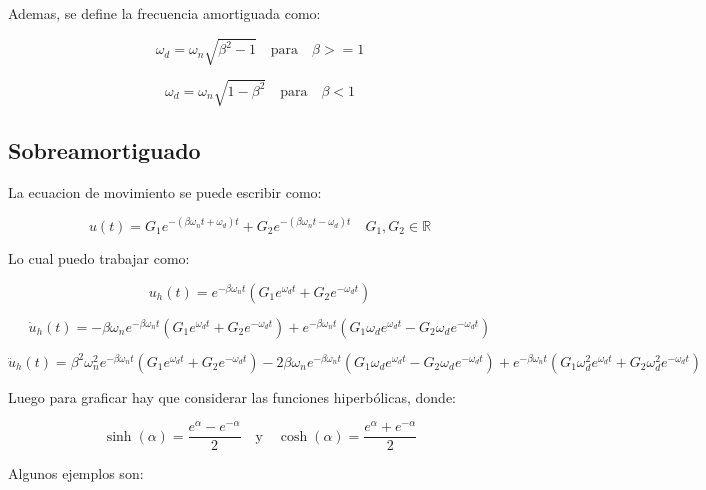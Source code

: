 \documentclass{article}  %
\begin{document}
Ademas, se define la frecuencia amortiguada como:

\begin{equation}
    \omega_d = \omega_n \sqrt{\beta^2 - 1} \quad \text{para} \quad \beta >= 1
\end{equation}

\begin{equation}
    \omega_d = \omega_n \sqrt{1 - \beta^2} \quad \text{para} \quad \beta < 1
\end{equation}
\subsection{Sobreamortiguado}

La ecuacion de movimiento se puede escribir como:

\begin{equation}
    u(t) = G_1 e^{-(\beta \omega_n t + \omega_d)t} + G_2 e^{-(\beta \omega_n t - \omega_d)t} \quad G_1, G_2 \in \mathbb{R}
\end{equation}

Lo cual puedo trabajar como:

\begin{equation}
    u_h(t) = e^{-\beta \omega_n t} (G_1 e^{\omega_d t} + G_2 e^{-\omega_d t}) 
\end{equation}

\begin{equation}
    \dot{u}_h(t) = -\beta \omega_n e^{-\beta \omega_n t} (G_1 e^{\omega_d t} + G_2 e^{-\omega_d t}) + e^{-\beta \omega_n t} (G_1 \omega_d e^{\omega_d t} - G_2 \omega_d e^{-\omega_d t})
\end{equation}

\begin{equation}
    \ddot{u}_h(t) = \beta^2 \omega_n^2 e^{-\beta \omega_n t} (G_1 e^{\omega_d t} + G_2 e^{-\omega_d t}) - 2\beta \omega_n e^{-\beta \omega_n t} (G_1 \omega_d e^{\omega_d t} - G_2 \omega_d e^{-\omega_d t}) + e^{-\beta \omega_n t} (G_1 \omega_d^2 e^{\omega_d t} + G_2 \omega_d^2 e^{-\omega_d t})
\end{equation}

Luego para graficar hay que considerar las funciones hiperbólicas, donde:

\begin{equation}
    \sinh(\alpha) = \frac{e^{\alpha} - e^{-\alpha}}{2} \quad \text{y} \quad \cosh(\alpha) = \frac{e^{\alpha} + e^{-\alpha}}{2}
\end{equation}

Algunos ejemplos son:
\end{document}
